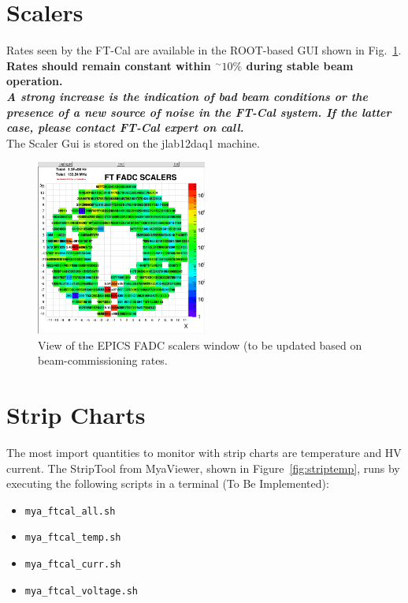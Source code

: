 \documentclass[11.5pt]{article}
\begin{document}
 \section{Scalers}      
Rates seen by the FT-Cal are available in the ROOT-based GUI shown in Fig.~\ref{Scalers}.\\
\textbf{Rates should remain constant within $^\sim10\%$ during stable beam operation.}\\
\textit{\textbf{A strong increase is the indication of bad beam conditions or the presence of a new source of noise in the FT-Cal system.  If the latter case, please contact FT-Cal expert on call.}}\\
The Scaler Gui is stored on the jlab12daq1 machine.   
\begin{figure}[htbp]
\center
\includegraphics[width=0.5\textwidth]{pics/Scalers.png}
\caption{ \label{Scalers} View of the EPICS FADC scalers window (to be updated based on beam-commissioning rates.}
\end{figure}

\section{Strip Charts}
The most import quantities to monitor with strip charts are temperature and HV current.  
The StripTool from MyaViewer, shown in Figure~\ref{fig:striptemp}, runs by executing the following scripts in a terminal (To Be Implemented):
      \begin{itemize}
          \item \texttt{mya\_ftcal\_all.sh}
          \item \texttt{mya\_ftcal\_temp.sh}
          \item \texttt{mya\_ftcal\_curr.sh}
          \item \texttt{mya\_ftcal\_voltage.sh}
      \end{itemize}
\end{document}

